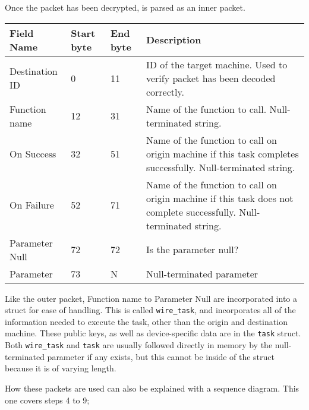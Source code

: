 \documentclass{article}
\begin{document}
Once the packet has been decrypted, is parsed as an inner packet.

\begin{table}[h]
\begin{tabular}{|p{25mm}|l|l|p{45mm}|}
\hline
\textbf{Field Name}	& \textbf{Start byte}		& \textbf{End byte}		& \textbf{Description} \\ \hline
Destination ID			& 0											& 11									& ID of the target machine. Used to verify packet has been decoded correctly.  \\ \hline
Function name				& 12										& 31									& Name of the function to call. Null-terminated string.  \\ \hline
On Success					& 32										& 51									& Name of the function to call on origin machine if this task completes successfully. Null-terminated string. \\ \hline
On Failure					& 52										& 71									& Name of the function to call on origin machine if this task does not complete successfully. Null-terminated string. \\ \hline
Parameter Null			& 72										& 72									& Is the parameter null? \\ \hline
Parameter						& 73										& N										& Null-terminated parameter \\ \hline
\end{tabular}
\end{table}

Like the outer packet, Function name to Parameter Null are incorporated into a struct for ease of handling. This is called \texttt{wire\_task}, and incorporates all of the information needed to execute the task, other than the origin and destination machine. These public keys, as well as device-specific data are in the \texttt{task} struct. Both \texttt{wire\_task} and \texttt{task} are usually followed directly in memory by the null-terminated parameter if any exists, but this cannot be inside of the struct because it is of varying length.

How these packets are used can also be explained with a sequence diagram. This one covers steps 4 to 9;
\end{document}
